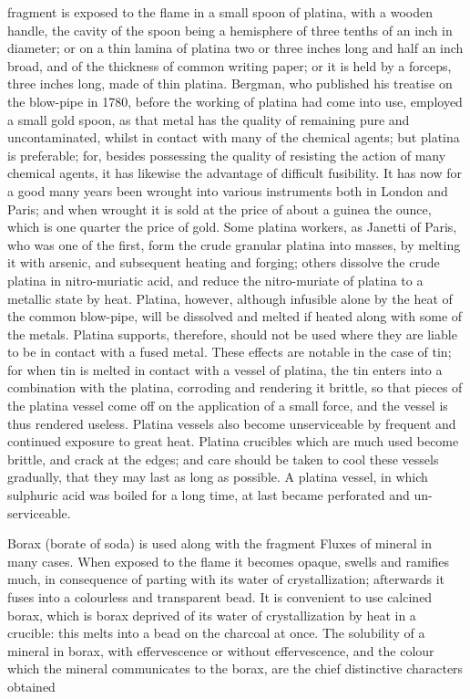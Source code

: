 \documentclass{article}
\begin{document}
fragment is exposed to the flame in a small spoon of platina, with a wooden handle, the cavity of the spoon being a hemisphere of three tenths of an inch in diameter; or on a thin lamina of platina two or three inches long and half an inch broad, and of the thickness of common writing paper; or it is held by a forceps, three inches long, made of thin platina. Bergman, who published his treatise on the blow-pipe in 1780, before the working of platina had come into use, employed a small gold spoon, as that metal has the quality of remaining pure and uncontaminated, whilst in contact with many of the chemical agents; but platina is preferable; for, besides possessing the quality of resisting the action of many chemical agents, it has likewise the advantage of difficult fusibility. It has now for a good many years been wrought into various instruments both in London and Paris; and when wrought it is sold at the price of about a guinea the ounce, which is one quarter the price of gold. Some platina workers, as Janetti of Paris, who was one of the first, form the crude granular platina into masses, by melting it with arsenic, and subsequent heating and forging; others dissolve the crude platina in nitro-muriatic acid, and reduce the nitro-muriate of platina to a metallic state by heat. Platina, however, although infusible alone by the heat of the common blow-pipe, will be dissolved and melted if heated along with some of the metals. Platina supports, therefore, should not be used where they are liable to be in contact with a fused metal. These effects are notable in the case of tin; for when tin is melted in contact with a vessel of platina, the tin enters into a combination with the platina, corroding and rendering it brittle, so that pieces of the platina vessel come off on the application of a small force, and the vessel is thus rendered useless. Platina vessels also become unserviceable by frequent and continued exposure to great heat. Platina crucibles which are much used become brittle, and crack at the edges; and care should be taken to cool these vessels gradually, that they may last as long as possible. A platina vessel, in which sulphuric acid was boiled for a long time, at last became perforated and un- serviceable.

Borax (borate of soda) is used along with the fragment Fluxes of mineral in many cases. When exposed to the flame it becomes opaque, swells and ramifies much, in consequence of parting with its water of crystallization; afterwards it fuses into a colourless and transparent bead. It is convenient to use calcined borax, which is borax deprived of its water of crystallization by heat in a crucible: this melts into a bead on the charcoal at once. The solubility of a mineral in borax, with effervescence or without effervescence, and the colour which the mineral communicates to the borax, are the chief distinctive characters obtained
\end{document}
